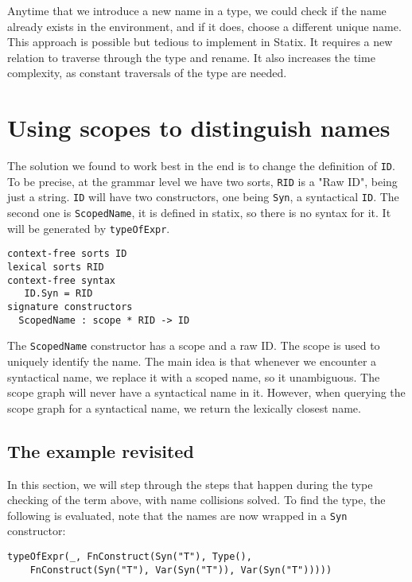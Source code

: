 Anytime that we introduce a new name in a type, we could check if the name already exists in the environment, and if it does, choose a different unique name. This approach is possible but tedious to implement in Statix. It requires a new relation to traverse through the type and rename. It also increases the time complexity, as constant traversals of the type are needed.


\section{Using scopes to distinguish names}

The solution we found to work best in the end is to change the definition of \verb|ID|. To be precise, at the grammar level we have two sorts, \verb|RID| is a "Raw ID", being just a string. \verb|ID| will have two constructors, one being \verb|Syn|, a syntactical \verb|ID|. The second one is \verb|ScopedName|, it is defined in statix, so there is no syntax for it. It will be generated by \verb|typeOfExpr|.

\begin{lstlisting}
context-free sorts ID
lexical sorts RID
context-free syntax
   ID.Syn = RID
signature constructors
  ScopedName : scope * RID -> ID
\end{lstlisting}

The \verb|ScopedName| constructor has a scope and a raw ID. The scope is used to uniquely identify the name. The main idea is that whenever we encounter a syntactical name, we replace it with a scoped name, so it unambiguous. The scope graph will never have a syntactical name in it. However, when querying the scope graph for a syntactical name, we return the lexically closest name.

\subsection{The example revisited}

In this section, we will step through the steps that happen during the type checking of the term above, with name collisions solved. To find the type, the following is evaluated, note that the names are now wrapped in a \verb|Syn| constructor:

\begin{lstlisting}
typeOfExpr(_, FnConstruct(Syn("T"), Type(),
	FnConstruct(Syn("T"), Var(Syn("T")), Var(Syn("T")))))
\end{lstlisting}


